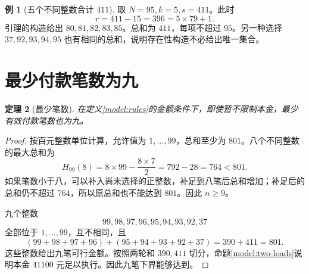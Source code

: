 \documentclass[UTF8,a4paper]{ctexbook}
\newtheorem{theorem}{定理}[chapter]
\theoremstyle{definition}
\newtheorem{example}[theorem]{例}
\numberwithin{equation}{chapter}
\newcommand{\1}{\mathbf{1}}
\begin{document}
\begin{example}[五个不同整数合计 $411$]
取 $N=95,k=5,s=411$。此时
\[
r=411-15=396=5\times79+1.
\]
引理的构造给出 $80,81,82,83,85$。总和为 $411$，每项不超过 $95$。另一种选择 $37,92,93,94,95$ 也有相同的总和，说明存在性构造不必给出唯一集合。
\end{example}

\section{最少付款笔数为九}
\begin{theorem}[最少笔数]\label{int:nine}
在定义\ref{model:rules}的金额条件下，即使暂不限制本金，最少有效付款笔数也为九。
\end{theorem}
\begin{proof}
按百元整数单位计算，允许值为 $1,\ldots,99$，总和至少为 $801$。八个不同整数的最大总和为
\[
H_{99}(8)=8\times99-\frac{8\times7}{2}=792-28=764<801.
\]
如果笔数小于八，可以补入尚未选择的正整数，补足到八笔后总和增加；补足后的总和仍不超过 $764$，所以原总和也不能达到 $801$。因此 $n\ge9$。

九个整数
\[
99,98,97,96,95,94,93,92,37
\]
全部位于 $1,\ldots,99$，互不相同，且
\[
(99+98+97+96)+(95+94+93+92+37)=390+411=801.
\]
这些整数给出九笔可行金额。按照两轮和 $390,411$ 切分，命题\ref{model:two-loads}说明本金 $41100$ 元足以执行。因此九笔下界能够达到。
\end{proof}
\end{document}
